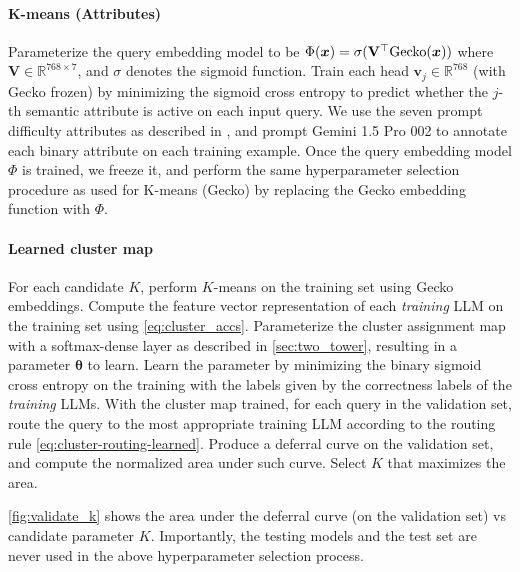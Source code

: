 \paragraph{K-means (Attributes)}
Parameterize the query embedding model to be  $\Phi(\boldsymbol{x}) = \sigma(\mathbf{V}^\top \mathrm{Gecko}(\boldsymbol{x}))$ where $\mathbf{V} \in \mathbb{R}^{768 \times 7}$, and $\sigma$ denotes the sigmoid function.
Train each head $\mathbf{v}_j \in \mathbb{R}^{768}$  (with $\mathrm{Gecko}$ frozen) by minimizing the sigmoid cross entropy to predict whether the $j$-th semantic attribute is active on each input query.  We use the seven prompt difficulty attributes as described in \citet{Li:2024c}, and prompt Gemini 1.5 Pro 002 to annotate each binary attribute on each training example.
Once the query embedding model $\Phi$ is trained, we freeze it, and perform the same hyperparameter selection procedure as used for K-means (Gecko) by replacing the Gecko embedding function with $\Phi$.

\paragraph{Learned cluster map}
For each candidate $K$, perform $K$-means on the training set using Gecko embeddings.
Compute the feature vector representation of each \emph{training} LLM on the training set using \eqref{eq:cluster_accs}. 
Parameterize the cluster assignment map with a softmax-dense layer as described in  \cref{sec:two_tower}, resulting in a parameter $\boldsymbol{\theta}$ to learn. Learn the parameter by minimizing the binary sigmoid cross entropy on the training with the labels given by the correctness labels of the \emph{training} LLMs.
With the cluster map trained, for each query in the validation set, route the query to the most appropriate training LLM according to the routing rule \eqref{eq:cluster-routing-learned}.
Produce a deferral curve on the validation set, and compute the normalized area under such curve. Select $K$ that maximizes the area.


\cref{fig:validate_k} shows the area under the deferral curve (on the validation set) vs candidate parameter $K$. Importantly, the testing models and the test set are never used in the above hyperparameter selection process.

